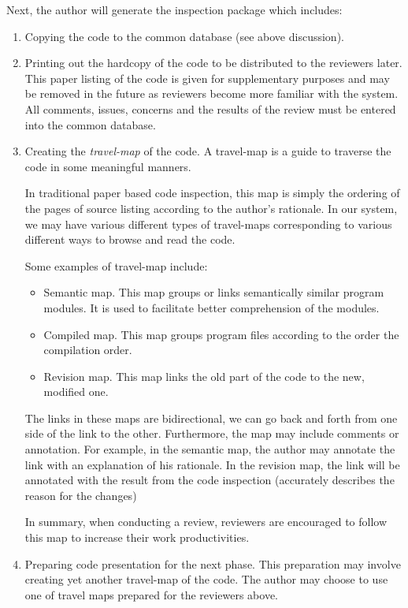 Next, the author will generate the inspection package which includes:
\begin {enumerate}
\item Copying the code to the common database (see above discussion).
\item Printing out the  hardcopy of the code
to be distributed to the reviewers later.  This paper listing of the code
is given  for supplementary purposes and may be removed in the future as
reviewers become more familiar with the system.
All comments, issues, concerns and the results of the review must be entered
into the common database.
\item Creating the {\it travel-map} of the code.  
A travel-map is a guide to traverse the code in some meaningful manners.

In traditional paper based code inspection, this map is simply the
ordering of the pages of source listing according to the author's
rationale.
In our system, we may have various different types of travel-maps
corresponding to various different ways to browse and read the code.  

\noindent Some examples of travel-map include:
\begin {itemize}
\item Semantic map. This map  groups
or links semantically similar program modules.  It is used
to facilitate better comprehension of the modules.
\item Compiled map. This map groups program files
according to the order the compilation order.
\item Revision map. This map links the old part of the code to the new,
modified one.
\end {itemize}

The links in these maps are bidirectional, we can go back and forth
from one side of the link to the other.  Furthermore, the map may
include comments or annotation.  For example, in the semantic map, the author
may annotate the link  with an explanation of his rationale.
In the revision map, the link will be 
annotated with the result from the code inspection (accurately
describes the reason for the changes)

In summary, when conducting a review, reviewers are encouraged to follow
this map to increase their work productivities.

\item Preparing code presentation for the next phase.  This preparation
may involve creating yet another travel-map of the code.
The author may choose to use one of travel maps prepared
for the reviewers above.
\end {enumerate}

